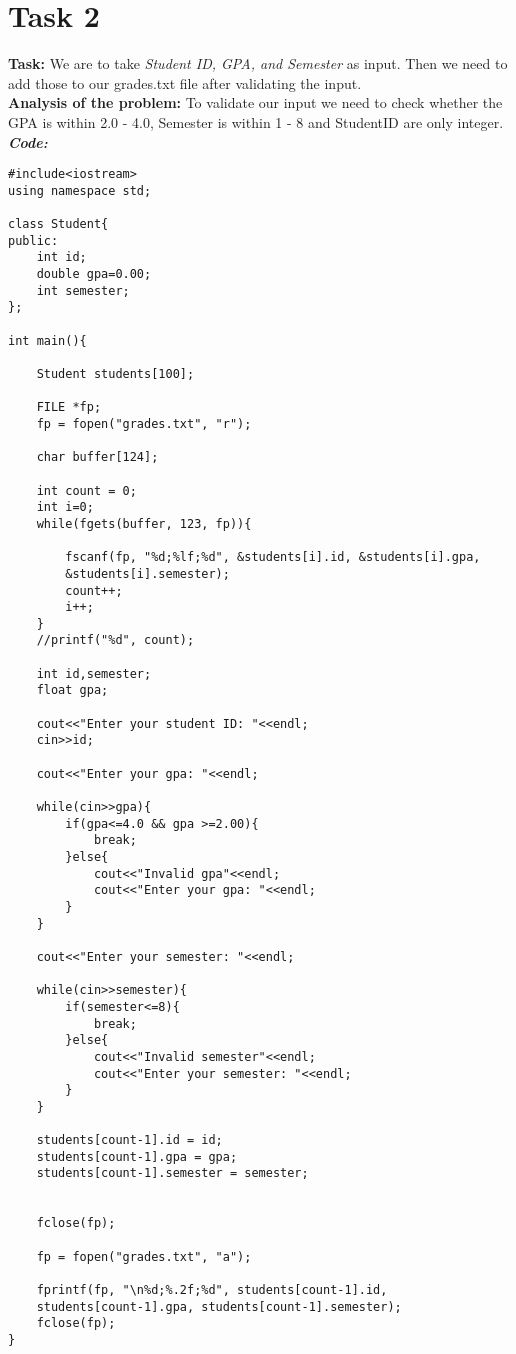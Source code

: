 \documentclass[a4paper, left=1in, right=1in,12pt]{article}
\begin{document}
\section*{Task 2}
\textbf{Task: }We are to take \textit{Student ID, GPA, and Semester} as input. Then we need to add those to our grades.txt file after validating the input.\\
\textbf{Analysis of the problem: }To validate our input we need to check whether the GPA is within 2.0 - 4.0, Semester is within 1 - 8 and StudentID are only integer.\newline\newline
\textbf{\textit{\large Code:}}\newline
\begin{verbatim}
#include<iostream>
using namespace std;

class Student{
public:
    int id;
    double gpa=0.00;
    int semester;
};

int main(){

    Student students[100];

    FILE *fp;
    fp = fopen("grades.txt", "r");

    char buffer[124];

    int count = 0;
    int i=0;
    while(fgets(buffer, 123, fp)){

        fscanf(fp, "%d;%lf;%d", &students[i].id, &students[i].gpa,
        &students[i].semester);
        count++;
        i++;
    }
    //printf("%d", count);

    int id,semester;
    float gpa;

    cout<<"Enter your student ID: "<<endl;
    cin>>id;

    cout<<"Enter your gpa: "<<endl;

    while(cin>>gpa){
        if(gpa<=4.0 && gpa >=2.00){
            break;
        }else{
            cout<<"Invalid gpa"<<endl;
            cout<<"Enter your gpa: "<<endl;
        }
    }

    cout<<"Enter your semester: "<<endl;

    while(cin>>semester){
        if(semester<=8){
            break;
        }else{
            cout<<"Invalid semester"<<endl;
            cout<<"Enter your semester: "<<endl;
        }
    }

    students[count-1].id = id;
    students[count-1].gpa = gpa;
    students[count-1].semester = semester;


    fclose(fp);

    fp = fopen("grades.txt", "a");

    fprintf(fp, "\n%d;%.2f;%d", students[count-1].id,
    students[count-1].gpa, students[count-1].semester);
    fclose(fp);
}


\end{verbatim}
\end{document}
